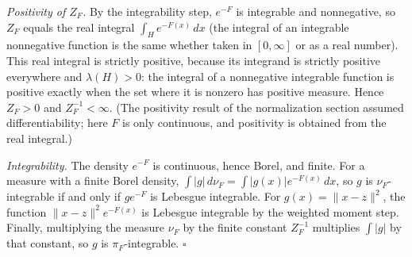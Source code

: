 \documentclass[11pt,a4paper]{article}
\begin{document}
\emph{Positivity of \(Z_F\).} By the integrability step, \(e^{-F}\) is integrable and nonnegative, so \(Z_F\) equals the real integral \(\int_He^{-F(x)}\,dx\) (the integral of an integrable nonnegative function is the same whether taken in \([0,\infty]\) or as a real number). This real integral is strictly positive, because its integrand is strictly positive everywhere and \(\lambda(H)>0\): the integral of a nonnegative integrable function is positive exactly when the set where it is nonzero has positive measure. Hence \(Z_F>0\) and \(Z_F^{-1}<\infty\). (The positivity result of the normalization section assumed differentiability; here \(F\) is only continuous, and positivity is obtained from the real integral.)




\emph{Integrability.} The density \(e^{-F}\) is continuous, hence Borel, and finite. For a measure with a finite Borel density, \(\int|g|\,d\nu_F=\int|g(x)|e^{-F(x)}\,dx\), so \(g\) is \(\nu_F\)-integrable if and only if \(ge^{-F}\) is Lebesgue integrable. For \(g(x)=\|x-z\|^2\), the function \(\|x-z\|^2e^{-F(x)}\) is Lebesgue integrable by the weighted moment step. Finally, multiplying the measure \(\nu_F\) by the finite constant \(Z_F^{-1}\) multiplies \(\int|g|\) by that constant, so \(g\) is \(\pi_F\)-integrable. \(\square\)
\end{document}
